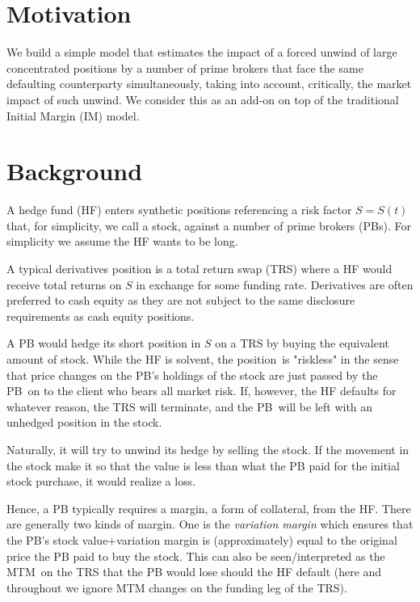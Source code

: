 \documentclass{article}
\begin{document}
\section{Motivation}

We build a simple model that estimates the impact of a forced unwind of
large concentrated positions by a number of prime brokers that face the same
defaulting counterparty simultaneously, taking into account, critically, the
market impact of such unwind. We consider this as an add-on on top of the
traditional Initial Margin (IM) model.

\section{Background}

A hedge fund (HF) enters synthetic positions referencing a risk factor $%
S=S(t)$ that, for simplicity, we call a stock, against a number of prime
brokers (PBs). For simplicity we assume the HF wants to be long. 

A typical derivatives position is a total return swap (TRS) where a HF would
receive total returns on $S$ in exchange for some funding rate. Derivatives
are often preferred to cash equity as they are not subject to the same
disclosure requirements as cash equity positions.

A PB would hedge its short position in $S$ on a TRS by buying the equivalent
amount of stock. While the HF is solvent, the position\ is "riskless" in the
sense that price changes on the PB's holdings of the stock are just passed
by the PB\ on to the client who bears all market risk. If, however, the HF
defaults for whatever reason, the TRS will terminate, and the PB\ will be
left with an unhedged position in the stock. 

Naturally, it will try to unwind its hedge by selling the stock. If the
movement in the stock make it so that the value is less than what the PB
paid for the initial stock purchase, it would realize a loss. 

Hence, a PB typically requires a margin, a form of collateral, from the HF.
There are generally two kinds of margin. One is the \emph{variation margin}
which ensures that the PB's stock value+variation margin is (approximately)
equal to the original price the PB paid to buy the stock. This can also be
seen/interpreted as the MTM\ on the TRS that the PB would lose should the HF
default (here and throughout we ignore MTM changes on the funding leg of the
TRS). 
\end{document}
